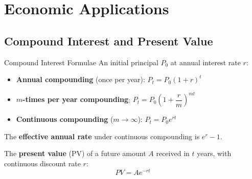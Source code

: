 \documentclass[12pt, a4paper]{article}
\theoremstyle{definition}
\begin{document}
\section{Economic Applications}

\subsection{Compound Interest and Present Value}

\begin{defbox}{Compound Interest Formulae}
An initial principal $P_0$ at annual interest rate $r$:
\begin{itemize}
  \item \textbf{Annual compounding} (once per year): $P_t = P_0(1+r)^t$
  \item \textbf{$m$-times per year compounding}: $P_t = P_0\left(1+\dfrac{r}{m}\right)^{mt}$
  \item \textbf{Continuous compounding} ($m \to \infty$): $P_t = P_0 e^{rt}$
\end{itemize}
The \textbf{effective annual rate} under continuous compounding is $e^r - 1$.

The \textbf{present value} (PV) of a future amount $A$ received in $t$ years, with continuous discount rate $r$:
\[
  PV = Ae^{-rt}
\]
\end{defbox}
\end{document}
